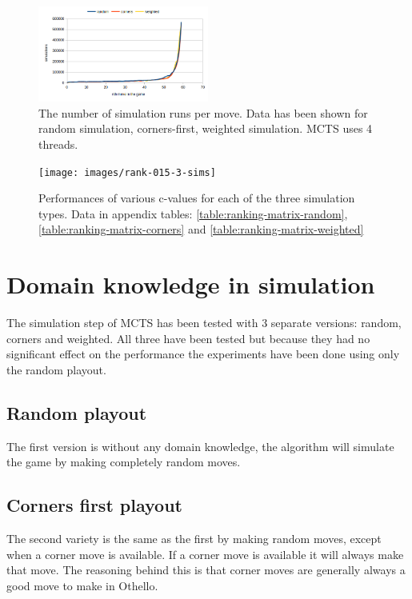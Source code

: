 \documentclass[
11pt, %
english, %
singlespacing, %
headsepline, %
]{MastersDoctoralThesis} %
\begin{document}
\begin{figure}
	\centering
	\includegraphics[width=0.5\textwidth]{images/mcts-simulations-domainknowledge}
	\caption{The number of simulation runs per move. Data has been shown for random simulation, corners-first, weighted simulation. MCTS uses 4 threads.}
	\label{fig:mcts-domainknowledge}
\end{figure}

\begin{figure}
	\centering
	\texttt{[image: images/rank-015-3-sims]}
	\caption{Performances of various c-values for each of the three simulation types. Data in appendix tables: \ref{table:ranking-matrix-random}, \ref{table:ranking-matrix-corners} and \ref{table:ranking-matrix-weighted}}
	\label{fig:mcts-domainknowledge-performance}
\end{figure}

\section{Domain knowledge in simulation}
The simulation step of MCTS has been tested with 3 separate versions: random, corners and weighted. All three have been tested but because they had no significant effect on the performance the experiments have been done using only the random playout.

\subsection{Random playout}
The first version is without any domain knowledge, the algorithm will simulate the game by making completely random moves.

\subsection{Corners first playout}
The second variety is the same as the first by making random moves, except when a corner move is available. If a corner move is available it will always make that move. The reasoning behind this is that corner moves are generally always a good move to make in Othello.
\end{document}

